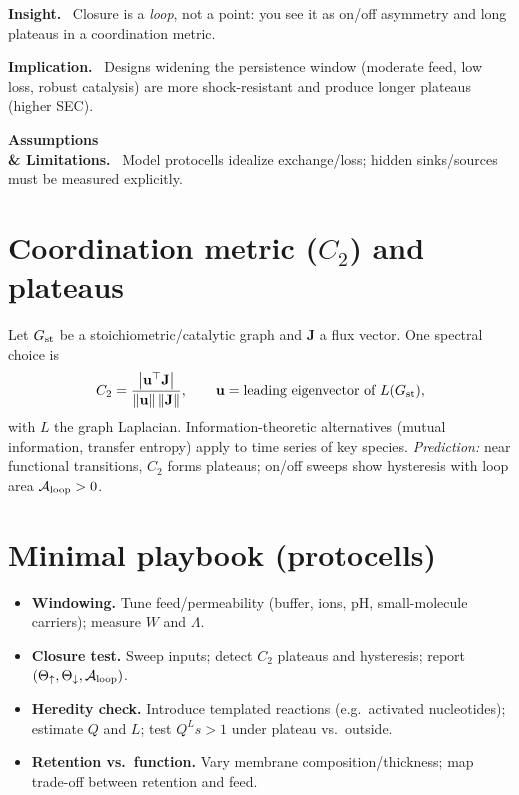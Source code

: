 \documentclass[12pt,a4paper,oneside]{scrreprt}
\newenvironment{insight}{\par\vspace{0.5em}\noindent\textbf{Insight.}\ }{\par\vspace{0.5em}}
\newenvironment{implication}{\par\vspace{0.5em}\noindent\textbf{Implication.}\ }{\par\vspace{0.5em}}
\newenvironment{limitation}{\par\vspace{0.5em}\noindent\textbf{Assumptions \\ \& Limitations.}\ }{\par\vspace{0.5em}}
\begin{document}
\begin{insight}
Closure is a \emph{loop}, not a point: you see it as on/off asymmetry and long plateaus in a coordination metric.
\end{insight}

\begin{implication}
Designs widening the persistence window (moderate feed, low loss, robust catalysis) are more shock-resistant and produce longer plateaus (higher SEC).
\end{implication}

\begin{limitation}
Model protocells idealize exchange/loss; hidden sinks/sources must be measured explicitly.
\end{limitation}

\section{Coordination metric ($C_2$) and plateaus}\label{sec:life-C2}
Let $G_{\rm st}$ be a stoichiometric/catalytic graph and $\mathbf J$ a flux vector. 
One spectral choice is
\begin{equation}
C_2=\frac{\left|\mathbf u^\top \mathbf J\right|}{\|\mathbf u\|\,\|\mathbf J\|},\qquad 
\mathbf u=\text{leading eigenvector of }L(G_{\rm st}),
\end{equation}
with $L$ the graph Laplacian. 
Information-theoretic alternatives (mutual information, transfer entropy) apply to time series of key species. 
\emph{Prediction:} near functional transitions, $C_2$ forms plateaus; on/off sweeps show hysteresis with loop area $\mathcal A_{\rm loop}>0$.

\section{Minimal playbook (protocells)}\label{sec:life-playbook}
\begin{itemize}
\item \textbf{Windowing.} Tune feed/permeability (buffer, ions, pH, small-molecule carriers); measure $W$ and $\Lambda$.
\item \textbf{Closure test.} Sweep inputs; detect $C_2$ plateaus and hysteresis; report $(\Theta_\uparrow,\Theta_\downarrow,\mathcal A_{\rm loop})$.
\item \textbf{Heredity check.} Introduce templated reactions (e.g.\ activated nucleotides); estimate $Q$ and $L$; test $Q^L s>1$ under plateau vs.\ outside.
\item \textbf{Retention vs.\ function.} Vary membrane composition/thickness; map trade-off between retention and feed.
\end{itemize}
\end{document}
